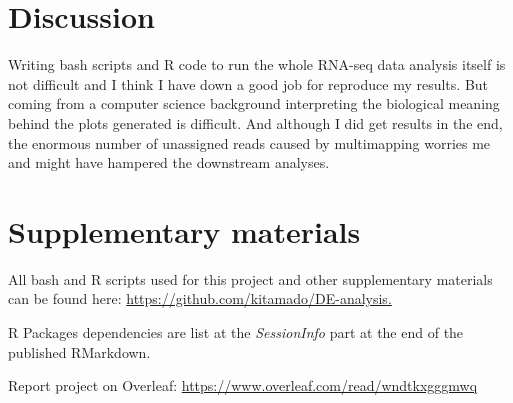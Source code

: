 \documentclass[onecolumn]{article}
\begin{document}
\section{Discussion}

Writing bash scripts and R code to run the whole RNA-seq data analysis itself is not difficult and I think I have down a good job for reproduce my results. But coming from a computer science background interpreting the biological meaning behind the plots generated is difficult. And although I did get results in the end, the enormous number of unassigned reads caused by multimapping worries me and might have hampered the downstream analyses.

\section{Supplementary materials}

All bash and R scripts used for this project and other supplementary materials can be found
here: \url{https://github.com/kitamado/DE-analysis.}

R Packages dependencies are list at the \emph{SessionInfo} part at the end of the published RMarkdown.

Report project on Overleaf: \url{https://www.overleaf.com/read/wndtkxgggmwq}

\printbibliography
\end{document}
